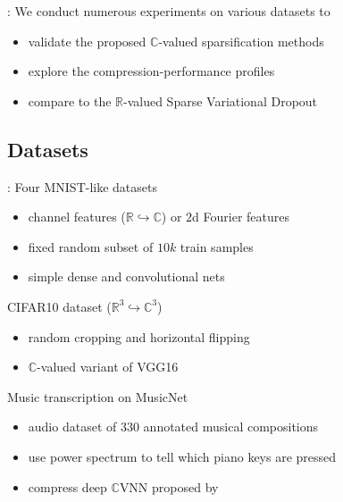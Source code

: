 \documentclass{beamer}
\newcommand{\real}{\mathbb{R}}
\newcommand{\cplx}{\mathbb{C}}
\begin{document}
\begin{frame}[c]{\insertsection: \insertsubsection}
  We conduct numerous experiments on various datasets to
  \begin{itemize}
    \item validate the proposed $\cplx$-valued sparsification methods
    \item explore the compression-performance profiles
    \item compare to the $\real$-valued Sparse Variational Dropout
  \end{itemize}

\end{frame}


\subsection{Datasets} %
\label{sub:datasets}

\begin{frame}[t]{\insertsection: \insertsubsection}
  Four MNIST-like datasets
  \begin{itemize}
    \item channel features ($\real \hookrightarrow \cplx$) or $2$d Fourier features
    \item fixed random subset of $10k$ train samples
    \item simple dense and convolutional nets
  \end{itemize}

  \pause
  \medskip
  CIFAR10 dataset ($\real^3 \hookrightarrow \cplx^3$)
  \begin{itemize}
    \item random cropping and horizontal flipping
    \item $\cplx$-valued variant of VGG16 {\tiny \citep{simonyan_very_2015}}
  \end{itemize}

  \pause
  \medskip
  Music transcription on MusicNet {\tiny \citep{thickstun_learning_2017}}
  \begin{itemize}
    \item audio dataset of $330$ annotated musical compositions
    \item use power spectrum to tell which piano keys are pressed
    \item compress deep $\cplx$VNN proposed by \citep{trabelsi_deep_2018}
  \end{itemize}

\end{frame}
\end{document}
